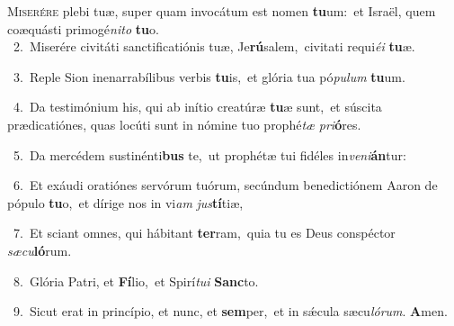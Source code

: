 \lettrine{\initial\textcolor{\initialcolor}{M}}{iserére} plebi tuæ, super quam invocátum est nomen \textbf{tu}\-um:~\star et Israël, quem coæquásti primogé\-\textit{ni}\-\textit{to} \textbf{tu}\-o.\\
{\numbfont\textcolor{\numbcolor}{~2.}}~Miserére civitáti sanctificatiónis tuæ, Je\-\textbf{rú}\-salem,~\star civitati requi\-\textit{é}\-\textit{i} \textbf{tu}\-æ.\par
{\numbfont\textcolor{\numbcolor}{~3.}}~Reple Sion inenarrabílibus verbis \textbf{tu}\-is,~\star et glória tua pó\-\textit{pu}\-\textit{lum} \textbf{tu}\-um.\par
{\numbfont\textcolor{\numbcolor}{~4.}}~Da testimónium his, qui ab inítio creatúræ \textbf{tu}\-æ sunt,~\star et súscita prædicatiónes, quas locúti sunt in nómine tuo prophé\textit{tæ} \textit{pri}\-\textbf{ó}res.\par
{\numbfont\textcolor{\numbcolor}{~5.}}~Da mercédem sustinénti\textbf{bus} te,~\star ut prophétæ tui fidéles in\-\textit{ve}\-\textit{ni}\textbf{án}tur:\par
{\numbfont\textcolor{\numbcolor}{~6.}}~Et exáudi oratiónes servórum tuórum, secúndum benedictiónem Aaron de pópulo \textbf{tu}\-o,~\star et dírige nos in vi\textit{am} \textit{jus}\-\textbf{tí}tiæ,\par
{\numbfont\textcolor{\numbcolor}{~7.}}~Et sciant omnes, qui hábitant \textbf{ter}\-ram,~\star quia tu es Deus conspéctor \textit{sæ}\-\textit{cu}\textbf{ló}rum.\par
{\numbfont\textcolor{\numbcolor}{~8.}}~Glória Patri, et \textbf{Fí}\-lio,~\star et Spirí\-\textit{tu}\-\textit{i} \textbf{Sanc}\-to.\par
{\numbfont\textcolor{\numbcolor}{~9.}}~Sicut erat in princípio, et nunc, et \textbf{sem}\-per,~\star et in sǽcula sæcu\-\textit{ló}\-\textit{rum}. \textbf{A}\-men.\par
